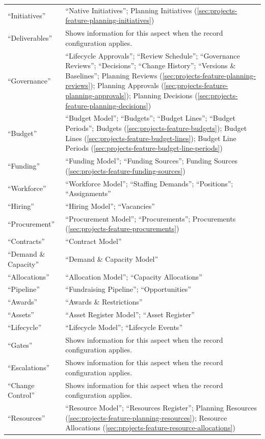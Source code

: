 \begin{table}[H]
\begin{tabularx}{\linewidth}{R{4.2cm} Y}
“Initiatives” & “Native Initiatives”; Planning Initiatives (\ref{sec:projects-feature-planning-initiatives})\\
“Deliverables” & Shows information for this aspect when the record configuration applies.\\
“Governance” & “Lifecycle Approvals”; “Review Schedule”; “Governance Reviews”; “Decisions”; “Change History”; “Versions \& Baselines”; Planning Reviews (\ref{sec:projects-feature-planning-reviews}); Planning Approvals (\ref{sec:projects-feature-planning-approvals}); Planning Decisions (\ref{sec:projects-feature-planning-decisions})\\
“Budget” & “Budget Model”; “Budgets”; “Budget Lines”; “Budget Periods”; Budgets (\ref{sec:projects-feature-budgets}); Budget Lines (\ref{sec:projects-feature-budget-lines}); Budget Line Periods (\ref{sec:projects-feature-budget-line-periods})\\
“Funding” & “Funding Model”; “Funding Sources”; Funding Sources (\ref{sec:projects-feature-funding-sources})\\
“Workforce” & “Workforce Model”; “Staffing Demands”; “Positions”; “Assignments”\\
“Hiring” & “Hiring Model”; “Vacancies”\\
“Procurement” & “Procurement Model”; “Procurements”; Procurements (\ref{sec:projects-feature-procurements})\\
“Contracts” & “Contract Model”\\
“Demand \& Capacity” & “Demand \& Capacity Model”\\
“Allocations” & “Allocation Model”; “Capacity Allocations”\\
“Pipeline” & “Fundraising Pipeline”; “Opportunities”\\
“Awards” & “Awards \& Restrictions”\\
“Assets” & “Asset Register Model”; “Asset Register”\\
“Lifecycle” & “Lifecycle Model”; “Lifecycle Events”\\
“Gates” & Shows information for this aspect when the record configuration applies.\\
“Escalations” & Shows information for this aspect when the record configuration applies.\\
“Change Control” & Shows information for this aspect when the record configuration applies.\\
“Resources” & “Resource Model”; “Resources Register”; Planning Resources (\ref{sec:projects-feature-planning-resources}); Resource Allocations (\ref{sec:projects-feature-resource-allocations})\\

\end{tabularx}
\end{table}
